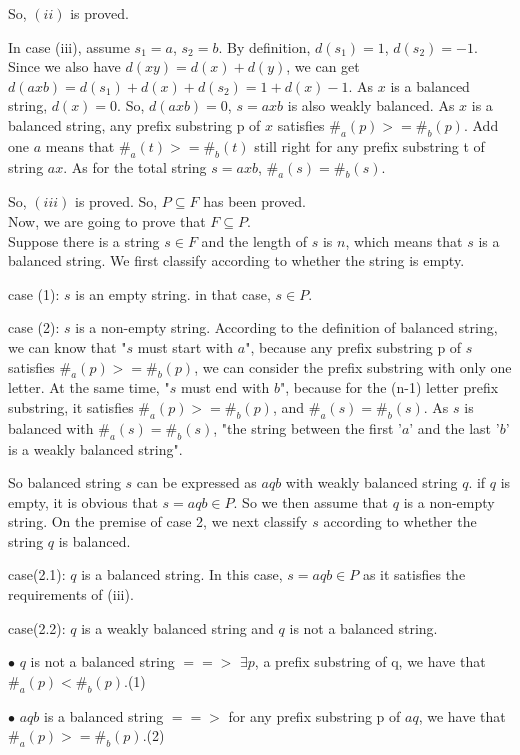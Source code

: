 \documentclass[12pt,a4paper]{article}
\begin{document}
So, $(ii)$ is proved. 

In case (iii), assume $s_1=a$, $s_2=b$. By definition, $d(s_1)=1$, $d(s_2)=-1$. Since we also have $d(xy) = d(x)+d(y)$, we can get $d(axb)=d(s_1)+d(x)+d(s_2)=1+d(x)-1$. As $x$ is a balanced string, $d(x)=0$. So, $d(axb)=0$, $s=axb$ is also weakly balanced. As $x$ is a balanced string, any prefix substring p of $x$ satisfies $\#_{a}(p) >= \#_{b}(p)$. Add one $a$ means that $\#_{a}(t) >= \#_{b}(t)$ still right for any prefix substring t of string $ax$. As for the total string $s=axb$, $\#_{a}(s) = \#_{b}(s)$.

So, $(iii)$ is proved. 
So, $P\subseteq F$ has been proved.\\


Now, we are going to prove that $F\subseteq P$.\\

Suppose there is a string $s \in F$ and the length of $s$ is $n$, which means that $s$ is a balanced string. We first classify according to whether the string is empty.


case (1): $s$ is an empty string. in that case, $s \in P$.


case (2): $s$ is a non-empty string. According to the definition of balanced string, we can know that "$s$ must start with $a$", because any prefix substring p of $s$ satisfies $\#_{a}(p) >= \#_{b}(p)$, we can consider the prefix substring with only one letter. At the same time, "$s$ must end with $b$", because for the (n-1) letter prefix substring, it satisfies $\#_{a}(p) >= \#_{b}(p)$, and $\#_{a}(s) = \#_{b}(s)$. As $s$ is balanced with $\#_{a}(s) = \#_{b}(s)$, "the string between the first '$a$' and the last '$b$' is a weakly balanced string".


So balanced string $s$ can be expressed as $aqb$ with weakly balanced string $q$. if $q$ is empty, it is obvious that $s=aqb \in P$. So we then assume that $q$ is a non-empty string. On the premise of case 2, we next classify $s$ according to whether the string $q$ is balanced.


case(2.1): $q$ is a balanced string. In this case, $s=aqb \in P$ as it satisfies the requirements of (iii).


case(2.2): $q$ is a weakly balanced string and $q$ is not a balanced string.


$\bullet$ $q$ is not a balanced string $==>$  $\exists p$, a prefix substring of q, we have that $\#_{a}(p) < \#_{b}(p)$.(1)


$\bullet$ $aqb$ is a balanced string $==>$ for any prefix substring p of $aq$, we have that  $\#_{a}(p) >= \#_{b}(p)$.(2)
\end{document}
